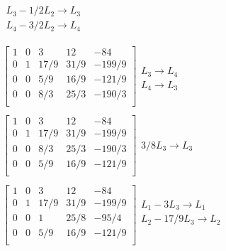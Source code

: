 \documentclass[]{article}
\begin{document}
\[\begin{array}{l}
\begin{array}{l}
\\ 
 L_{3} - 1/2 L_{2} \rightarrow L_{3} \\ 
 L_{4} - 3/2 L_{2} \rightarrow L_{4} \\ 
\end{array}\\
 \\
\left[
\begin{array}{rrrr|r}
1 & 0 & 3 & 12 & -84 \\ 
0 & 1 & 17/9 & 31/9 & -199/9 \\ 
0 & 0 & 5/9 & 16/9 & -121/9 \\ 
0 & 0 & 8/3 & 25/3 & -190/3 \\ 
\end{array}
\right]\begin{array}{l}
\\ 
\\ 
L_{3} \rightarrow L_{4}\\ 
L_{4} \rightarrow L_{3}\\ 
\end{array}\\
 \\
\left[
\begin{array}{rrrr|r}
1 & 0 & 3 & 12 & -84 \\ 
0 & 1 & 17/9 & 31/9 & -199/9 \\ 
0 & 0 & 8/3 & 25/3 & -190/3 \\ 
0 & 0 & 5/9 & 16/9 & -121/9 \\ 
\end{array}
\right]\begin{array}{l}
\\ 
\\ 
3/8 L_{3} \rightarrow L_{3}\\ 
\\ 
\end{array}\\
 \\
\left[
\begin{array}{rrrr|r}
1 & 0 & 3 & 12 & -84 \\ 
0 & 1 & 17/9 & 31/9 & -199/9 \\ 
0 & 0 & 1 & 25/8 & -95/4 \\ 
0 & 0 & 5/9 & 16/9 & -121/9 \\ 
\end{array}
\right]\begin{array}{l}
 L_{1} - 3 L_{3} \rightarrow L_{1} \\ 
 L_{2} - 17/9 L_{3} \rightarrow L_{2} \\ 

\end{array}
\end{array}\]
\end{document}

